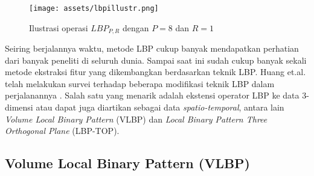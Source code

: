 \documentclass[review,3p,12pt,times]{elsarticle}
\begin{document}
\begin{figure}[hbt!]
\caption{Ilustrasi operasi $LBP_{P,R}$ dengan $P=8$ dan $R=1$}
\label{fig:lbpillustr}
\centering
	\texttt{[image: assets/lbpillustr.png]}
	
\end{figure}

Seiring berjalannya waktu, metode LBP cukup banyak mendapatkan perhatian dari banyak peneliti di seluruh dunia. Sampai saat ini sudah cukup banyak sekali metode ekstraksi fitur yang dikembangkan berdasarkan teknik LBP. Huang et.al. telah melakukan survei terhadap beberapa modifikasi teknik LBP dalam perjalanannya \cite{huang2011local}. Salah satu yang menarik adalah ekstensi operator LBP ke data 3-dimensi atau dapat juga diartikan sebagai data \textit{spatio-temporal}, antara lain \textit{Volume Local Binary Pattern} (VLBP) dan \textit{Local Binary Pattern Three Orthogonal Plane} (LBP-TOP).

\subsection{Volume Local Binary Pattern (VLBP)}
\label{vlbp}
\end{document}
